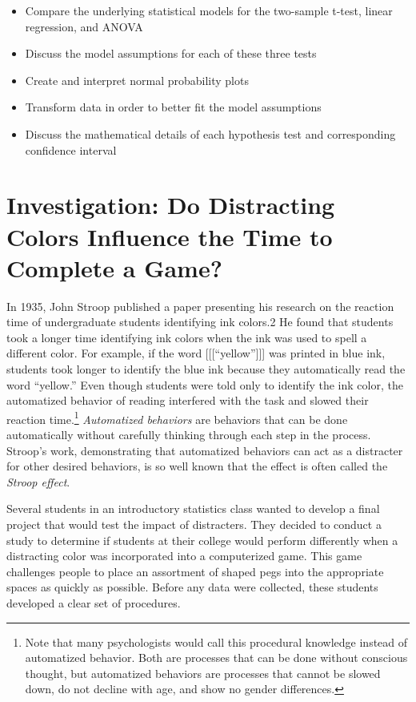 \documentclass[
]{report}
\providecommand{\tightlist}{%
  \setlength{\itemsep}{0pt}\setlength{\parskip}{0pt}}
\begin{document}
\begin{itemize}
\tightlist
\item
  Compare the underlying statistical models for the two-sample t-test, linear regression, and
  ANOVA
\item
  Discuss the model assumptions for each of these three tests
\item
  Create and interpret normal probability plots
\item
  Transform data in order to better fit the model assumptions
\item
  Discuss the mathematical details of each hypothesis test and corresponding confidence interval
\end{itemize}

\newpage

\section{Investigation: Do Distracting Colors Influence the Time to Complete a Game?}\label{investigation-do-distracting-colors-influence-the-time-to-complete-a-game}

In 1935, John Stroop published a paper presenting his research on the reaction time of undergraduate students identifying ink colors.2 He found that students took a longer time identifying ink colors when the ink was used to spell a different color. For example, if the word {[}{[}{[}``yellow''{]}{]}{]} was printed in blue ink, students took longer to identify the blue ink because they automatically read the word ``yellow.'' Even though students were told only to identify the ink color, the automatized behavior of reading interfered with the task and slowed their reaction time.\footnote{Note that many psychologists would call this procedural knowledge instead of automatized behavior. Both are processes that can be done without conscious thought, but automatized behaviors are processes that cannot be slowed down, do not
  decline with age, and show no gender differences.} \emph{Automatized behaviors} are behaviors that can be done automatically without carefully thinking through each step in the process. Stroop's work, demonstrating that automatized behaviors can act as a distracter for other desired behaviors, is so well known that the effect is often called the \emph{Stroop effect}.

Several students in an introductory statistics class wanted to develop a final project that would test the impact of distracters. They decided to conduct a study to determine if students at their college would perform differently when a distracting color was incorporated into a computerized game. This game challenges people to place an assortment of shaped pegs into the appropriate spaces as quickly as possible. Before any data were collected, these students developed a clear set of procedures.
\end{document}
